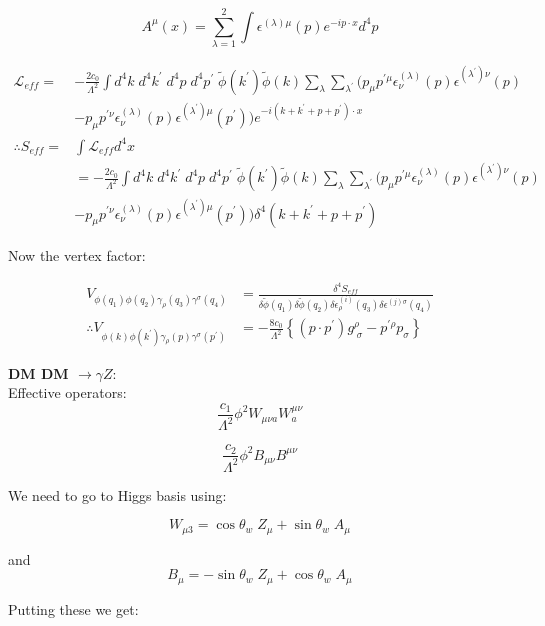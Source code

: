 \documentclass[12pt]{report}
\begin{document}
$$ A^\mu (x) = \sum_{\lambda=1}^2 \int \epsilon^{(\lambda) \mu}(p) e^{-i p \cdot x} d^4p$$

\begin{align*}
\mathscr{L}_{eff}=&- \frac{2c_0}{\Lambda^2} \int d^4k\; d^4k^\prime \; d^4p \; d^4p^\prime \; \tilde{\phi}(k^\prime) \tilde{\phi}(k) \sum_\lambda \sum_{\lambda^\prime} (p_\mu p^{\prime \mu} \epsilon^{(\lambda)}_\nu(p) \epsilon^{(\lambda^\prime) \nu}(p)\\
&-p_\mu p^{\prime \nu} \epsilon^{(\lambda)}_\nu(p) \epsilon^{(\lambda^\prime) \mu}(p^\prime)) e^{-i (k+k^\prime +p+p^\prime) \cdot x}\\
\therefore S_{eff} =& \int \mathscr{L}_{eff} d^4x\\
&=- \frac{2c_0}{\Lambda^2} \int d^4k\; d^4k^\prime \; d^4p \; d^4p^\prime \; \tilde{\phi}(k^\prime) \tilde{\phi}(k) \sum_\lambda \sum_{\lambda^\prime} (p_\mu p^{\prime \mu} \epsilon^{(\lambda)}_\nu(p) \epsilon^{(\lambda^\prime) \nu}(p)\\
&-p_\mu p^{\prime \nu} \epsilon^{(\lambda)}_\nu(p) \epsilon^{(\lambda^\prime) \mu}(p^\prime)) \delta^4(k+k^\prime +p+p^\prime)
\end{align*}

Now the vertex factor:

\begin{align}
V_{\phi(q_1) \phi(q_2) \gamma_\rho(q_3) \gamma^\sigma(q_4)} &=\frac{\delta^4 S_{eff}}{\delta \tilde{\phi}(q_1) \delta \tilde{\phi}(q_2) \delta\epsilon^{(i)}_\rho(q_3) \delta \epsilon^{(j)\sigma}(q_4)}\\
\therefore V_{\phi(k) \phi(k^\prime) \gamma_\rho(p) \gamma^\sigma(p^\prime)}&= -\frac{8c_0}{\Lambda^2} \left\{ (p\cdot p^\prime) g^\rho_{\; \sigma }- p^{\prime \rho} p_\sigma \right\} \label{gv}
\end{align}




\textbf{DM DM $\longrightarrow \gamma Z$}:\\


Effective operators: $$\frac{c_1}{\Lambda^2} \phi^2 W_{\mu \nu a} W^{\mu \nu}_a$$

$$\frac{c_2}{\Lambda^2} \phi^2 B_{\mu \nu} B^{\mu \nu}$$


We need to go to Higgs basis using:

$$W_{\mu 3} = \cos\theta_w\; Z_\mu +\sin\theta_w\; A_\mu$$

and
$$B_\mu= -\sin\theta_w\; Z_\mu + \cos\theta_w \; A_\mu $$


Putting these we get:
\end{document}
